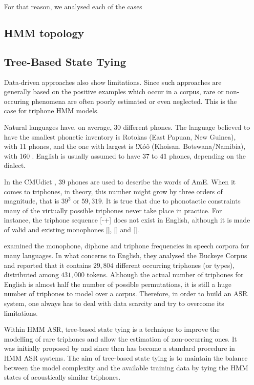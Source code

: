 For that reason, we analysed each of the cases 


\subsection{HMM topology}

\subsection{Tree-Based State Tying}

Data-driven approaches also show limitations. Since such approaches are generally based on 
the positive examples which occur in a corpus, rare or non-occuring phenomena are often poorly estimated or even neglected.
This is the case for triphone \ac{HMM} models. 

Natural languages have, on average, $30$ different phones. The language believed to have the smallest phonetic inventory is 
Rotokas (East Papuan, New Guinea), with 11 phones, and the one with largest is !X\'o\~o  (Khoisan, Botswana/Namibia), 
with 160 \citep{Hayes2011}. English is usually assumed to have 37 to 41 phones, depending on the dialect. 

In the \ac{CMUdict} \citep{CMU2008}, 39 phones are used to describe the words of \ac{AmE}. When it comes to triphones, in theory, 
this number might grow by three orders of magnitude, that is $39^3$ or $59,319$. It is true that due to phonotactic constraints
many of the virtually possible triphones never take place in practice. 
For instance, the triphone sequence [-+] does not exist in English, although it 
is made of valid and existing monophones [], [] and []. 

\citeauthor{Kuperman2008} \citep{Kuperman2008} examined the monophone, diphone and triphone frequencies in speech corpora
for many languages. In what concerns to English, they analysed the Buckeye Corpus and reported that it contains $29,804$ different 
occurring triphones (or types), distributed among $431,000$ tokens. Although the actual number of triphones for English is
almost half the number of possible permutations, it is still a huge number of triphones to model over a corpus. 
Therefore, in order to build an \ac{ASR} system, one always has to deal with data scarcity and try to overcome its limitations.

Within \ac{HMM} \ac{ASR}, tree-based state tying is a technique to improve the modelling of rare triphones and allow the 
estimation of non-occurring ones. It was initially proposed by \citeauthor{Young1994} \citep{Young1994} and since then
has become a standard procedure in \ac{HMM} \ac{ASR} systems. The aim of tree-based state tying is to maintain the balance 
between the model complexity and the available training data by tying the \ac{HMM} states of acoustically similar triphones.

